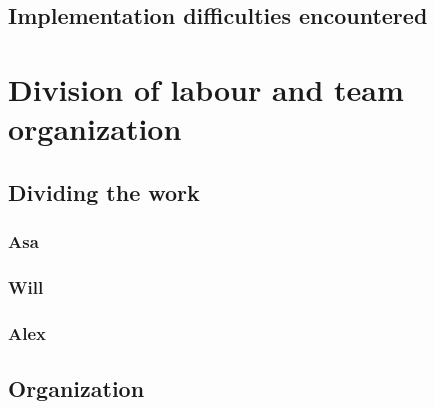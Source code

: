 \documentclass{article}
\begin{document}
\subsection{Implementation difficulties encountered}



\section{Division of labour and team organization}

\subsection{Dividing the work}

\subsubsection{Asa}


\subsubsection{Will}


\subsubsection{Alex}


\subsection{Organization}
\end{document}

